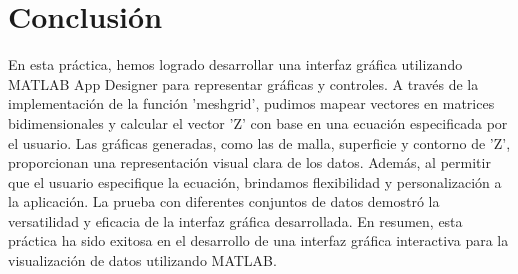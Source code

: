 \documentclass{article}
\begin{document}
	\newpage
	
	\section{Conclusión}
	
	En esta práctica, hemos logrado desarrollar una interfaz gráfica utilizando MATLAB App Designer para representar gráficas y controles. A través de la implementación de la función 'meshgrid', pudimos mapear vectores en matrices bidimensionales y calcular el vector 'Z' con base en una ecuación especificada por el usuario. Las gráficas generadas, como las de malla, superficie y contorno de 'Z', proporcionan una representación visual clara de los datos. Además, al permitir que el usuario especifique la ecuación, brindamos flexibilidad y personalización a la aplicación. La prueba con diferentes conjuntos de datos demostró la versatilidad y eficacia de la interfaz gráfica desarrollada. En resumen, esta práctica ha sido exitosa en el desarrollo de una interfaz gráfica interactiva para la visualización de datos utilizando MATLAB.
	
\end{document}
